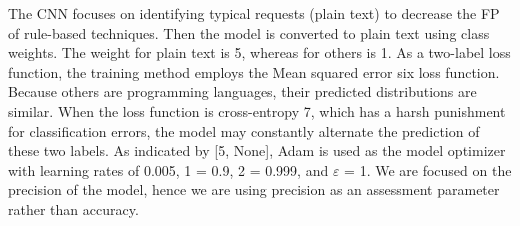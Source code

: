 The CNN focuses on identifying typical requests (plain text) to decrease the FP of rule-based techniques. Then the model is converted to plain text using class weights. The weight for plain text is 5, whereas for others is 1. As a two-label loss function, the training method employs the Mean squared error six loss function. Because others are programming languages, their predicted distributions are similar. When the loss function is cross-entropy 7, which has a harsh punishment for classification errors, the model may constantly alternate the prediction of these two labels. As indicated by [5, None], Adam is used as the model optimizer with learning rates of 0.005, 1 = 0.9, 2 = 0.999, and $\varepsilon$ = 1. We are focused on the precision of the model, hence we are using precision as an assessment parameter rather than accuracy.

